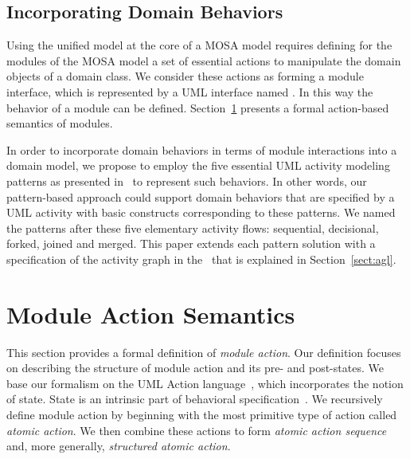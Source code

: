 \subsection{Incorporating Domain Behaviors} 
\label{sect:domainBehaviors}

Using the unified model at the core of a MOSA model requires defining for the modules of the MOSA model a set of essential actions to manipulate the domain objects of a domain class.
%
We consider these actions as forming a module interface, which is represented by a UML interface named  . In this way the behavior of a module can be defined. Section~\ref{sect:actSemantics} presents a formal action-based semantics of modules.

In order to incorporate domain behaviors in terms of module interactions into a domain model, we propose to employ the five essential UML activity modeling patterns as presented in~\cite{le_domain_2018} to represent such behaviors. In other words, our pattern-based approach could support domain behaviors that are specified by a UML activity with basic constructs corresponding to these patterns. We named the patterns after these five elementary activity flows: sequential, decisional, forked, joined and merged. This paper extends each pattern solution with a specification of the activity graph in the \agl~that is explained in Section~\ref{sect:agl}. 

\section{Module Action Semantics}
\label{sect:actSemantics}

This section provides a formal definition of \textit{module action}.
Our definition focuses on describing the structure of module action and its pre- and post-states. We base our formalism on the UML Action language~\cite{omg_unified_2015}, which incorporates the notion of state. State is an intrinsic part of behavioral specification~\cite{omg_unified_2015}.
%
We recursively define module action by beginning with the most primitive type of action called \textit{atomic action}. We then combine these actions to form \textit{atomic action sequence} and, more generally, \textit{structured atomic action}.


